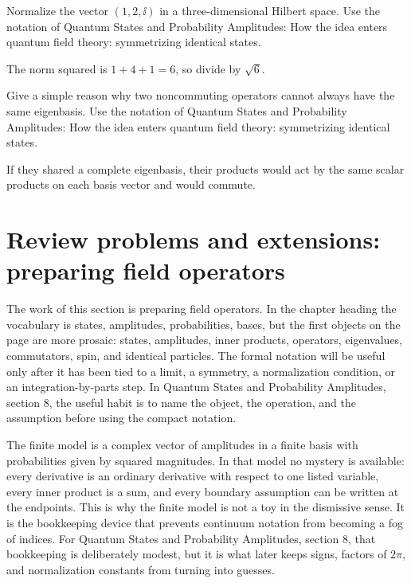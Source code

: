\begin{exercise}
Normalize the vector \((1,2,\ii)\) in a three-dimensional Hilbert space.  Use the notation of Quantum States and Probability Amplitudes: How the idea enters quantum field theory: symmetrizing identical states.
\begin{answer}
The norm squared is \(1+4+1=6\), so divide by \(\sqrt6\).
\end{answer}
\end{exercise}

\begin{exercise}
Give a simple reason why two noncommuting operators cannot always have the same eigenbasis.  Use the notation of Quantum States and Probability Amplitudes: How the idea enters quantum field theory: symmetrizing identical states.
\begin{answer}
If they shared a complete eigenbasis, their products would act by the same scalar products on each basis vector and would commute.
\end{answer}
\end{exercise}



\section{Review problems and extensions: preparing field operators}

The work of this section is preparing field operators.  In the chapter heading the vocabulary is states, amplitudes, probabilities, bases, but the first objects on the page are more prosaic: states, amplitudes, inner products, operators, eigenvalues, commutators, spin, and identical particles.  The formal notation will be useful only after it has been tied to a limit, a symmetry, a normalization condition, or an integration-by-parts step.  In Quantum States and Probability Amplitudes, section 8, the useful habit is to name the object, the operation, and the assumption before using the compact notation.

The finite model is a complex vector of amplitudes in a finite basis with probabilities given by squared magnitudes.  In that model no mystery is available: every derivative is an ordinary derivative with respect to one listed variable, every inner product is a sum, and every boundary assumption can be written at the endpoints.  This is why the finite model is not a toy in the dismissive sense.  It is the bookkeeping device that prevents continuum notation from becoming a fog of indices.  For Quantum States and Probability Amplitudes, section 8, that bookkeeping is deliberately modest, but it is what later keeps signs, factors of \(2\pi\), and normalization constants from turning into guesses.

